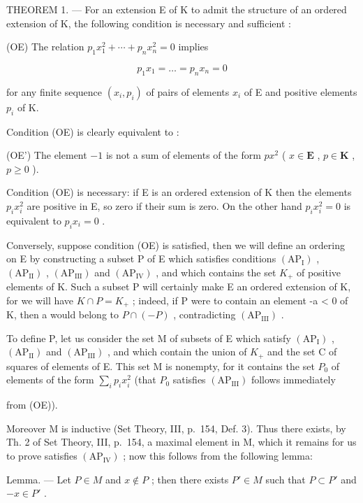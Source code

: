 THEOREM 1. --- For an extension E of K to admit the structure of an ordered extension of K, the following condition is necessary and sufficient :

(OE) The relation \(p_{1}x_{1}^{2} + \cdots + p_{n}x_{n}^{2} = 0\) implies

\[
p _ {1} x _ {1} = \dots = p _ {n} x _ {n} = 0
\]

for any finite sequence \((x_{i},p_{i})\) of pairs of elements \(x_{i}\) of E and positive elements \(p_i\) of K.

Condition (OE) is clearly equivalent to :

(OE') The element \(-1\) is not a sum of elements of the form \(px^2\) ( \(x \in \mathbf{E}\) , \(p \in \mathbf{K}\) , \(p \geqslant 0\) ).

Condition (OE) is necessary: if E is an ordered extension of K then the elements \(p_{i}x_{i}^{2}\) are positive in E, so zero if their sum is zero. On the other hand \(p_{i}x_{i}^{2}=0\) is equivalent to \(p_{i}x_{i}=0\) .

Conversely, suppose condition (OE) is satisfied, then we will define an ordering on E by constructing a subset P of E which satisfies conditions \((\mathrm{AP}_{\mathrm{I}})\) , \((\mathrm{AP}_{\mathrm{II}})\) , \((\mathrm{AP}_{\mathrm{III}})\) and \((\mathrm{AP}_{\mathrm{IV}})\) , and which contains the set \(K_{+}\) of positive elements of K. Such a subset P will certainly make E an ordered extension of K, for we will have \(K \cap P = K_{+}\) ; indeed, if P were to contain an element -a \textless{} 0 of K, then a would belong to \(P \cap (-P)\) , contradicting \((\mathrm{AP}_{\mathrm{III}})\) .

To define P, let us consider the set M of subsets of E which satisfy \((\mathrm{AP}_{\mathrm{I}})\) , \((\mathrm{AP}_{\mathrm{II}})\) and \((\mathrm{AP}_{\mathrm{III}})\) , and which contain the union of \(K_{+}\) and the set C of squares of elements of E. This set M is nonempty, for it contains the set \(P_{0}\) of elements of the form \(\sum_{i} p_{i} x_{i}^{2}\) (that \(P_{0}\) satisfies \((\mathrm{AP}_{\mathrm{III}})\) follows immediately

from (OE)).

Moreover M is inductive (Set Theory, III, p.~154, Def. 3). Thus there exists, by Th. 2 of Set Theory, III, p.~154, a maximal element in M, which it remains for us to prove satisfies \((\mathrm{AP}_{\mathrm{IV}})\) ; now this follows from the following lemma:

Lemma. --- Let \(P \in M\) and \(x \notin P\) ; then there exists \(P' \in M\) such that \(P \subset P'\) and \(-x \in P'\) .

